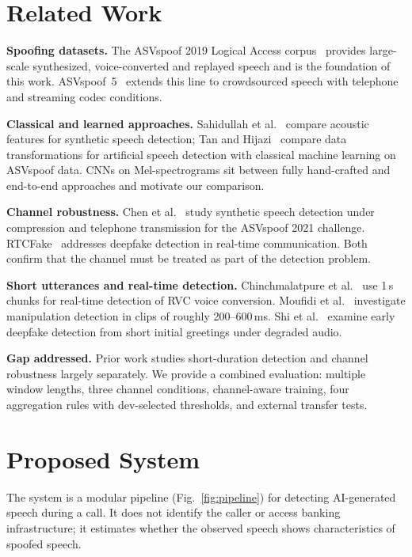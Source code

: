 \documentclass[conference]{IEEEtran}
\begin{document}
\section{Related Work}

\textbf{Spoofing datasets.}
The ASVspoof 2019 Logical Access corpus~\cite{asvspoof2019} provides large-scale synthesized, voice-converted and replayed speech and is the foundation of this work. ASVspoof~5~\cite{asvspoof5} extends this line to crowdsourced speech with telephone and streaming codec conditions.

\textbf{Classical and learned approaches.}
Sahidullah et al.~\cite{sahidullah2015} compare acoustic features for synthetic speech detection; Tan and Hijazi~\cite{tan2024} compare data transformations for artificial speech detection with classical machine learning on ASVspoof data. CNNs on Mel-spectrograms sit between fully hand-crafted and end-to-end approaches and motivate our comparison.

\textbf{Channel robustness.}
Chen et al.~\cite{chen2021} study synthetic speech detection under compression and telephone transmission for the ASVspoof 2021 challenge. RTCFake~\cite{rtcfake} addresses deepfake detection in real-time communication. Both confirm that the channel must be treated as part of the detection problem.

\textbf{Short utterances and real-time detection.}
Chinchmalatpure et al.~\cite{chinch2025} use 1\,s chunks for real-time detection of RVC voice conversion. Moufidi et al.~\cite{moufidi2025} investigate manipulation detection in clips of roughly 200--600\,ms. Shi et al.~\cite{shi2026} examine early deepfake detection from short initial greetings under degraded audio.

\textbf{Gap addressed.}
Prior work studies short-duration detection and channel robustness largely separately. We provide a combined evaluation: multiple window lengths, three channel conditions, channel-aware training, four aggregation rules with dev-selected thresholds, and external transfer tests.

\section{Proposed System}

The system is a modular pipeline (Fig.~\ref{fig:pipeline}) for detecting AI-generated speech during a call. It does not identify the caller or access banking infrastructure; it estimates whether the observed speech shows characteristics of spoofed speech.
\end{document}
